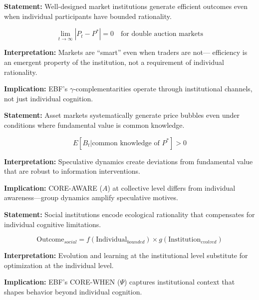 \begin{tcolorbox}[colback=gray!5!white, colframe=gray!75!black,
    title=Axiom VS-2: Institutional Efficiency]
\textbf{Statement:} Well-designed market institutions generate efficient
outcomes even when individual participants have bounded rationality.

\begin{equation}
\lim_{t \to \infty} |P_t - P^*| = 0 \quad \text{for double auction markets}
\end{equation}

\textbf{Interpretation:} Markets are ``smart'' even when traders are not---
efficiency is an emergent property of the institution, not a requirement of
individual rationality.

\textbf{Implication:} EBF's $\gamma$-complementarities operate through
institutional channels, not just individual cognition.
\end{tcolorbox}

\begin{tcolorbox}[colback=gray!5!white, colframe=gray!75!black,
    title=Axiom VS-3: Bubble Persistence]
\textbf{Statement:} Asset markets systematically generate price bubbles even
under conditions where fundamental value is common knowledge.

\begin{equation}
E[B_t | \text{common knowledge of } P^*] > 0
\end{equation}

\textbf{Interpretation:} Speculative dynamics create deviations from fundamental
value that are robust to information interventions.

\textbf{Implication:} CORE-AWARE ($A$) at collective level differs from
individual awareness---group dynamics amplify speculative motives.
\end{tcolorbox}

\begin{tcolorbox}[colback=gray!5!white, colframe=gray!75!black,
    title=Axiom VS-4: Ecological Rationality]
\textbf{Statement:} Social institutions encode ecological rationality that
compensates for individual cognitive limitations.

\begin{equation}
\text{Outcome}_{social} = f(\text{Individual}_{bounded}) \times g(\text{Institution}_{evolved})
\end{equation}

\textbf{Interpretation:} Evolution and learning at the institutional level
substitute for optimization at the individual level.

\textbf{Implication:} EBF's CORE-WHEN ($\Psi$) captures institutional context
that shapes behavior beyond individual cognition.
\end{tcolorbox}

